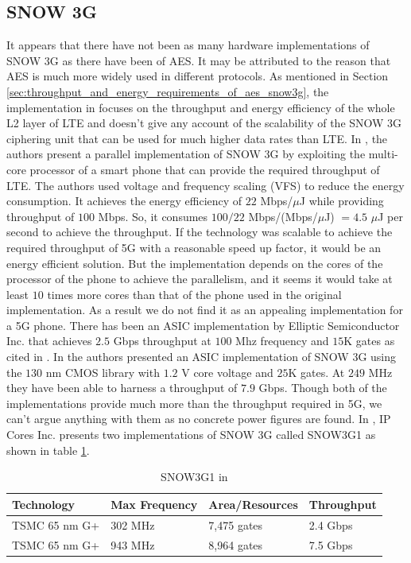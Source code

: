 \documentclass[12pt]{llncs}
\begin{document}
\subsection{SNOW 3G}
\label{sub-sec:snow3gp}
It appears that there have not been as many hardware implementations of SNOW 3G as there have been of AES. It may be attributed to the reason that AES is much more widely used in different protocols. As mentioned in Section \ref{sec:throughput_and_energy_requirements_of_aes_snow3g}, the implementation in \cite{IIS_Ruhr_2010} focuses on the throughput and energy efficiency of the whole L2 layer of LTE and doesn't give any account of the scalability of the SNOW 3G ciphering unit that can be used for much higher data rates than LTE. In \cite{IEEE_ICCT_2010}, the authors present a parallel implementation of SNOW 3G by exploiting the multi-core processor of a smart phone that can provide the required throughput of LTE. The authors used voltage and frequency scaling (VFS) to reduce the energy consumption. It achieves the energy efficiency of $22$ Mbps/$\mu$J while providing throughput of $100$ Mbps. So, it consumes $100/22$ Mbps/(Mbps/$\mu$J) $ = 4.5$ $\mu$J per second to achieve the throughput. If the technology was scalable to achieve the required throughput of 5G with a reasonable speed up factor, it would be an energy efficient solution. But the implementation depends on the cores of the processor of the phone to achieve the parallelism, and it seems it would take at least $10$ times more cores than that of the phone used in the original implementation. As a result we do not find it as an appealing implementation for a 5G phone. There has been an ASIC implementation by Elliptic Semiconductor Inc. that achieves $2.5$ Gbps throughput at $100$ Mhz frequency and $15$K gates as cited in \cite{Greece_SNOW3G}. In \cite{Greece_SNOW3G} the authors presented an ASIC implementation of SNOW 3G using the $130$ nm CMOS library with $1.2$ V core voltage and $25$K gates. At $249$ MHz they have been able to harness a throughput of $7.9$ Gbps. Though both of the implementations provide much more than the throughput required in 5G, we can't argue anything with them as no concrete power figures are found. In \cite{IP_cores}, IP Cores Inc. presents two implementations of SNOW 3G called SNOW3G1 as shown in table \ref{table:snow3g_implementation}.
\begin{table}
\begin{center}
\begin{tabular}{|p{}
				|p{}
				|p{}
				|p{}|				
				}
\hline
Technology & Max Frequency & Area/Resources & Throughput \\
\hline
TSMC 65 nm G+ & 302 MHz & 7,475 gates & 2.4 Gbps \\ \hline
TSMC 65 nm G+ & 943 MHz & 8,964 gates & 7.5 Gbps \\ \hline
\end{tabular}
\end{center}
\caption{SNOW3G1 in \cite{IP_cores}}
\label{table:snow3g_implementation}
\end{table}
\end{document}
